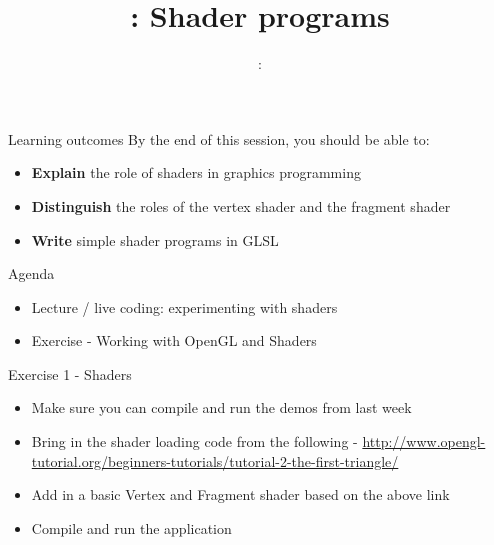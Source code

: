 \usepackage{../../beamerthemeFalmouthGamesAcademy}
\usepackage{multimedia}
\graphicspath{ {../../} }




\usepackage[normalem]{ulem}
\usepackage{wasysym}

\usepackage{pdfpages}

\usetikzlibrary{arrows,automata}




\title{\sessionnumber: Shader programs}
\subtitle{\modulecode: \moduletitle}

\frame{\titlepage} 

\begin{frame}{Learning outcomes}
	By the end of this session, you should be able to:
	\begin{itemize}
		\item \textbf{Explain} the role of shaders in graphics programming
		\item \textbf{Distinguish} the roles of the vertex shader and the fragment shader
		\item \textbf{Write} simple shader programs in GLSL
	\end{itemize}
\end{frame}

\begin{frame}{Agenda}
	\begin{itemize}
		\item Lecture / live coding: experimenting with shaders
		\item Exercise - Working with OpenGL and Shaders
	\end{itemize}
\end{frame}






\begin{frame}{Exercise 1 - Shaders}
	\begin{itemize}
		\item Make sure you can compile and run the demos from last week
		\item Bring in the shader loading code from the following - \url{http://www.opengl-tutorial.org/beginners-tutorials/tutorial-2-the-first-triangle/}
		\item Add in a basic Vertex and Fragment shader based on the above link
		\item Compile and run the application
	\end{itemize}
\end{frame}

